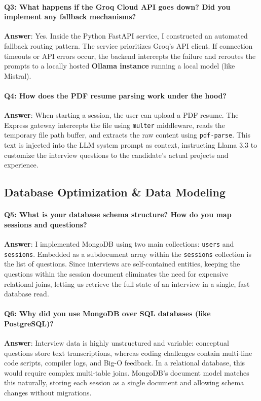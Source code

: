 \documentclass[11pt,a4paper]{article}
\begin{document}
\paragraph{Q3: What happens if the Groq Cloud API goes down? Did you implement any fallback mechanisms?}
\textbf{Answer}: Yes. Inside the Python FastAPI service, I constructed an automated fallback routing pattern. The service prioritizes Groq's API client. If connection timeouts or API errors occur, the backend intercepts the failure and reroutes the prompts to a locally hosted \textbf{Ollama instance} running a local model (like Mistral).

\paragraph{Q4: How does the PDF resume parsing work under the hood?}
\textbf{Answer}: When starting a session, the user can upload a PDF resume. The Express gateway intercepts the file using \texttt{multer} middleware, reads the temporary file path buffer, and extracts the raw content using \texttt{pdf-parse}. This text is injected into the LLM system prompt as context, instructing Llama 3.3 to customize the interview questions to the candidate's actual projects and experience.

\subsection{Database Optimization \& Data Modeling}

\paragraph{Q5: What is your database schema structure? How do you map sessions and questions?}
\textbf{Answer}: I implemented MongoDB using two main collections: \texttt{users} and \texttt{sessions}. Embedded as a subdocument array within the \texttt{sessions} collection is the list of questions. Since interviews are self-contained entities, keeping the questions within the session document eliminates the need for expensive relational joins, letting us retrieve the full state of an interview in a single, fast database read.

\paragraph{Q6: Why did you use MongoDB over SQL databases (like PostgreSQL)?}
\textbf{Answer}: Interview data is highly unstructured and variable: conceptual questions store text transcriptions, whereas coding challenges contain multi-line code scripts, compiler logs, and Big-O feedback. In a relational database, this would require complex multi-table joins. MongoDB's document model matches this naturally, storing each session as a single document and allowing schema changes without migrations.
\end{document}
